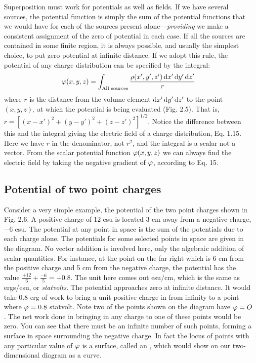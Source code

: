 Superposition must work for potentials as well as fields. If we
have several sources, the potential function is simply the sum of the
potential functions that we would have for each of the sources present
alone---\emph{providing} we make a consistent assignment of the zero of
potential in each case. If all the sources are contained in some finite
region, it is always possible, and usually the simplest choice, to put
zero potential at infinite distance. If we adopt this rule, the potential
of any charge distribution can be specified by the integral:
\begin{equation}
  \varphi(x,y,z) = \int_{\text{All sources}} \frac{\rho(x',y',z')\operatorname{d\!} x'\operatorname{d\!} y'\operatorname{d\!} z'}{r}
\end{equation}
where $r$ is the distance from the volume element $\operatorname{d\!} x'\operatorname{d\!} y'\operatorname{d\!} z'$ to the
point $(x,y,z)$, at which the potential is being evaluated (Fig. 2.5).
That is, $r = [(x - x')^2 + (y - y')^2 + (z - z')^2]^{1/2}$. Notice the
difference between this and the integral giving the electric field of a
charge distribution, Eq. 1.15. Here we have $r$ in the denominator,
not $r^2$, and the integral is a scalar not a vector. From the scalar potential
function $\varphi(x,y,z)$ we can always find the electric field by taking
the negative gradient of $\varphi$, according to Eq. 15.

\subsection{Potential of two point charges}

 Consider a very simple example,
the potential of the two point charges shown in Fig. 2.6. A positive
charge of 12 esu is located 3 cm away from a negative charge, $- 6$ esu.
The potential at any point in space is the sum of the potentials due to
each charge alone. The potentials for some selected points in space
are given in the diagram. No vector addition is involved here, only
the algebraic addition of scalar quantities. For instance, at the point
on the far right which is 6 cm from the positive charge and 5 cm from
the negative charge, the potential has the value $\frac{+12}{6}+\frac{-6}{5}=+0.8$.
The unit here comes out esu/cm, which is the same as ergs/esu, or
\emph{statvolts}. The potential approaches zero at infinite distance. It
would take 0.8 erg of work to bring a unit positive charge in from
infinity to a point where $\varphi = 0.8$ statvolt. Note two of the points
shown on the diagram have $\varphi = O$. The net work done in bringing
in any charge to one of these points would be zero. You can see that
there must be an infinite number of such points, forming a surface in
space surrounding the negative charge. In fact the locus of points
with any particular value of $\varphi$ is a surface, called an , which would show on our two-dimensional diagram as a
curve.

